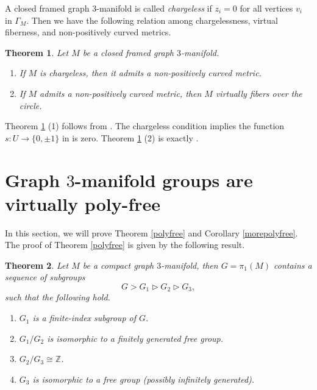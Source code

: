\documentclass{amsart}
\numberwithin{equation}{section}
\newtheorem{theorem}{Theorem}[section]
\theoremstyle{definition}
\begin{document}
A closed framed graph $3$-manifold is called {\it chargeless} if $z_i=0$ for all vertices $v_i$ in $\Gamma_M$. Then we have the following relation among chargelessness, virtual fiberness, and non-positively curved metrics.
\begin{theorem}\label{chargeless}
Let $M$ be a closed framed graph $3$-manifold.
\begin{enumerate}
\item If $M$ is chargeless, then it admits a non-positively curved metric.
\item If $M$ admits a non-positively curved metric, then $M$ virtually fibers over the circle.
\end{enumerate}
\end{theorem}

Theorem \ref{chargeless} (1) follows from \cite[Theorem 4.9]{BS}. The chargeless condition implies the function $s:U\to \{0,\pm1\}$ in \cite[Theorem 4.9]{BS} is zero. Theorem \ref{chargeless} (2) is exactly \cite[Corollary 2.4]{BS}.





 
\section{Graph $3$-manifold groups are virtually poly-free}\label{polyfreeproof}

In this section, we will prove Theorem \ref{polyfree} and Corollary \ref{morepolyfree}.
The proof of Theorem \ref{polyfree} is given by the following result.

\begin{theorem}\label{polyfreesubgroups}
Let $M$ be a compact graph $3$-manifold, then $G=\pi_1(M)$ contains a sequence of subgroups 
$$G>G_1\vartriangleright G_2 \vartriangleright G_3,$$ such that the following hold.
\begin{enumerate}
\item $G_1$ is a finite-index subgroup of $G$.
\item $G_1/G_2$ is isomorphic to a finitely generated free group.
\item $G_2/G_3\cong \mathbb{Z}$.
\item $G_3$ is isomorphic to a free group (possibly infinitely generated).
\end{enumerate}
\end{theorem}
\end{document}
